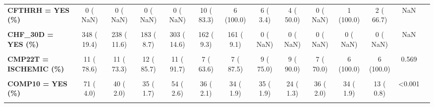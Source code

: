 \documentclass[
]{article}
\begin{document}
\begin{table}[H]
\begin{tabular}[t]{>{\raggedright\arraybackslash}p{5em}ccccccccccccc}
\textbf{CFTHRH = YES (\%)} & 0 (  NaN) & 0 (  NaN) & 0 (  NaN) & 0 (  NaN) & 10 ( 83.3) & 6 (100.0) & 6 (  3.4) & 4 ( 50.0) & 0 (  NaN) & 1 (100.0) & 2 ( 66.7) & NaN & \\
\textbf{\cellcolor{gray!10}{CFUNS = YES (\%)}} & \cellcolor{gray!10}{0 (  NaN)} & \cellcolor{gray!10}{0 (  NaN)} & \cellcolor{gray!10}{0 (  NaN)} & \cellcolor{gray!10}{0 (  NaN)} & \cellcolor{gray!10}{0 (  NaN)} & \cellcolor{gray!10}{0 (  NaN)} & \cellcolor{gray!10}{0 (  NaN)} & \cellcolor{gray!10}{15 (  1.0)} & \cellcolor{gray!10}{17 (  1.2)} & \cellcolor{gray!10}{26 (  1.8)} & \cellcolor{gray!10}{0 (  NaN)} & \cellcolor{gray!10}{NaN} & \cellcolor{gray!10}{}\\
\textbf{CHF\_30D = YES (\%)} & 348 ( 19.4) & 238 ( 11.6) & 183 (  8.7) & 303 ( 14.6) & 162 (  9.3) & 161 (  9.1) & 0 (  NaN) & 0 (  NaN) & 0 (  NaN) & 0 (  NaN) & 0 (  NaN) & NaN & \\
\textbf{\cellcolor{gray!10}{CLOP\_CHR = YES (\%)}} & \cellcolor{gray!10}{0 (  NaN)} & \cellcolor{gray!10}{63 (  3.1)} & \cellcolor{gray!10}{82 (  3.9)} & \cellcolor{gray!10}{155 (  7.6)} & \cellcolor{gray!10}{202 ( 11.6)} & \cellcolor{gray!10}{221 ( 12.5)} & \cellcolor{gray!10}{253 ( 13.5)} & \cellcolor{gray!10}{196 ( 11.4)} & \cellcolor{gray!10}{190 ( 15.6)} & \cellcolor{gray!10}{155 (  8.9)} & \cellcolor{gray!10}{102 (  5.8)} & \cellcolor{gray!10}{NaN} & \cellcolor{gray!10}{}\\
\textbf{CMP22T = ISCHEMIC (\%)} & 11 ( 78.6) & 11 ( 73.3) & 12 ( 85.7) & 11 ( 91.7) & 7 ( 63.6) & 7 ( 87.5) & 9 ( 75.0) & 9 ( 90.0) & 7 ( 70.0) & 6 (100.0) & 6 (100.0) & 0.569 & \\
\textbf{\cellcolor{gray!10}{COMP1 = YES (\%)}} & \cellcolor{gray!10}{321 ( 18.4)} & \cellcolor{gray!10}{214 ( 10.4)} & \cellcolor{gray!10}{142 (  6.8)} & \cellcolor{gray!10}{257 ( 12.5)} & \cellcolor{gray!10}{131 (  7.5)} & \cellcolor{gray!10}{139 (  7.8)} & \cellcolor{gray!10}{115 (  6.1)} & \cellcolor{gray!10}{105 (  5.9)} & \cellcolor{gray!10}{131 (  7.4)} & \cellcolor{gray!10}{148 (  8.5)} & \cellcolor{gray!10}{178 ( 10.3)} & \cellcolor{gray!10}{<0.001} & \cellcolor{gray!10}{}\\
\textbf{COMP10 = YES (\%)} & 71 (  4.0) & 40 (  2.0) & 35 (  1.7) & 54 (  2.6) & 36 (  2.1) & 34 (  1.9) & 35 (  1.9) & 24 (  1.3) & 36 (  2.0) & 34 (  1.9) & 13 (  0.8) & <0.001 & \\
\textbf{\cellcolor{gray!10}{COMP11 = YES (\%)}} & \cellcolor{gray!10}{45 (  2.5)} & \cellcolor{gray!10}{23 (  1.1)} & \cellcolor{gray!10}{29 (  1.4)} & \cellcolor{gray!10}{49 (  2.4)} & \cellcolor{gray!10}{17 (  1.0)} & \cellcolor{gray!10}{23 (  1.3)} & \cellcolor{gray!10}{25 (  1.3)} & \cellcolor{gray!10}{19 (  1.1)} & \cellcolor{gray!10}{19 (  1.1)} & \cellcolor{gray!10}{23 (  1.3)} & \cellcolor{gray!10}{16 (  0.9)} & \cellcolor{gray!10}{<0.001} & \cellcolor{gray!10}{}\\

\end{tabular}
\end{table}
\end{document}

